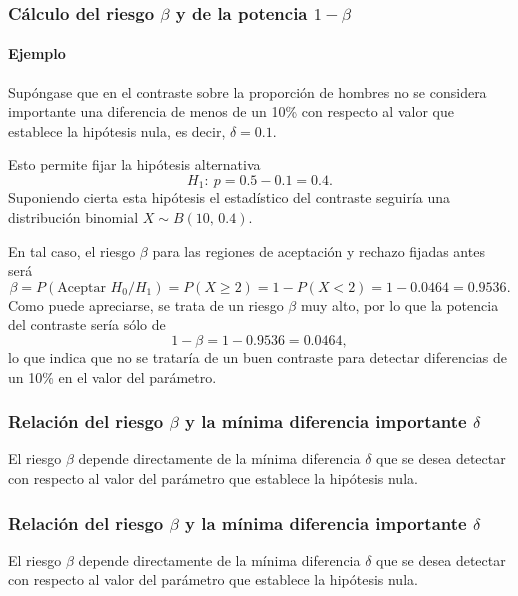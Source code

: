 \begin{frame}
\frametitle{Cálculo del riesgo $\beta$ y de la potencia $1-\beta$}
\framesubtitle{Ejemplo}
Supóngase que en el contraste sobre la proporción de hombres no se considera importante una diferencia de menos de un
10\% con respecto al valor que establece la hipótesis nula, es decir, $\delta=0.1$.

Esto permite fijar la hipótesis alternativa
\[
H_1:\ p=0.5-0.1=0.4.
\]
Suponiendo cierta esta hipótesis el estadístico del contraste seguiría una distribución binomial $X\sim B(10,\,0.4)$.

En tal caso, el riesgo $\beta$ para las regiones de aceptación y rechazo fijadas antes será
\[
\beta = P(\text{Aceptar }H_0/H_1) = P(X\geq 2) = 1 - P(X<2) = 1-0.0464 = 0.9536.
\]
Como puede apreciarse, se trata de un riesgo $\beta$ muy alto, por lo que la potencia del contraste sería sólo de
\[
1-\beta = 1-0.9536 = 0.0464,
\]
lo que indica que no se trataría de un buen contraste para detectar diferencias de un 10\% en el valor del parámetro.
\end{frame}


\begin{frame}
\frametitle{Relación del riesgo $\beta$ y la mínima diferencia importante $\delta$}
El riesgo $\beta$ depende directamente de la mínima diferencia $\delta$ que se desea detectar con respecto al valor del
parámetro que establece la hipótesis nula. 
\begin{center}
\scalebox{0.7}{}
\end{center}
\end{frame}


\begin{frame}
\frametitle{Relación del riesgo $\beta$ y la mínima diferencia importante $\delta$}
El riesgo $\beta$ depende directamente de la mínima diferencia $\delta$ que se desea detectar con respecto al valor del
parámetro que establece la hipótesis nula. 
\begin{center}
\scalebox{0.7}{}
\end{center}
\end{frame}


